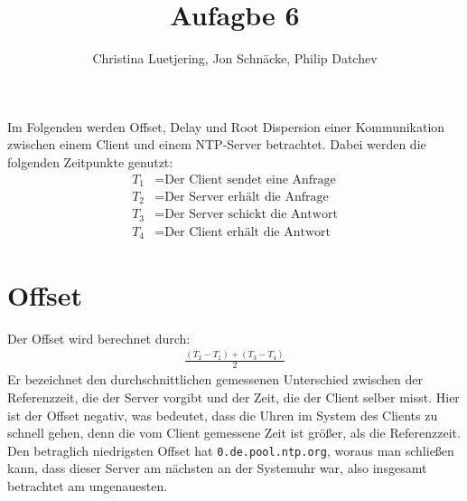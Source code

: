 \documentclass[a4paper,12pt]{scrartcl}
\title{Aufagbe 6}
\author{Christina Luetjering, Jon Schnäcke, Philip Datchev}
\begin{document}
\maketitle

Im Folgenden werden Offset, Delay und Root Dispersion einer Kommunikation zwischen einem Client und einem NTP-Server betrachtet.
Dabei werden die folgenden Zeitpunkte genutzt:
\begin{align*}
T_1 &= \text{Der Client sendet eine Anfrage} \\
T_2 &= \text{Der Server erhält die Anfrage} \\
T_3 &= \text{Der Server schickt die Antwort} \\
T_4 &= \text{Der Client erhält die Antwort}
\end{align*}

\section{Offset}



\begin{center}
\end{center}
Der Offset wird berechnet durch:
\begin{align*}
\frac{(T_2 -T_1) + (T_3 -T_4)}{2}
\end{align*}
Er bezeichnet den durchschnittlichen gemessenen Unterschied zwischen der Referenzzeit, die der Server vorgibt und der Zeit, die der Client selber misst. Hier ist der Offset negativ, was bedeutet, dass die Uhren im System des Clients zu schnell gehen, denn die vom Client gemessene Zeit ist größer, als die Referenzzeit. Den betraglich niedrigsten Offset hat \texttt{0.de.pool.ntp.org}, woraus man schließen kann, dass dieser Server am nächsten an der Systemuhr war, also insgesamt betrachtet am ungenauesten.
\end{document}
